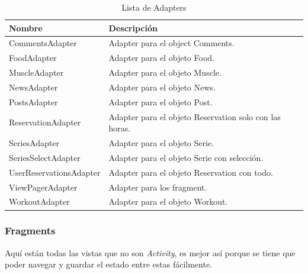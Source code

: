 \documentclass[12pt,a4paper]{article}
\begin{document}
\begin{table}[h!]
\centering
\begin{tabular}{  |l|l| }
\hline
Nombre & Descripción \\
\hline
 CommentsAdapter & Adapter para el object Comments. \\ 
 \hline
 FoodAdapter & Adapter para el objeto Food. \\  
 \hline
 MuscleAdapter & Adapter para el objeto Muscle. \\
 \hline
  NewsAdapter & Adapter para el objeto News. \\
 \hline
  PostsAdapter & Adapter para el objeto Post. \\
 \hline
  ReservationAdapter & Adapter para el objeto Reservation solo con las horas. \\
 \hline
 SeriesAdapter & Adapter para el objeto Serie. \\
 \hline
 SeriesSelectAdapter & Adapter para el objeto Serie con selección. \\
 \hline
 UserReservationsAdapter & Adapter para el objeto Reservation con todo. \\
 \hline
 ViewPagerAdapter & Adapter para los fragment. \\
 \hline
 WorkoutAdapter & Adapter para el objeto Workout. \\
 \hline
\end{tabular}
\caption{Lista de Adapters}
\end{table}

\subsubsection{Fragments}
Aquí están todas las vistas que no son \textit{Activity}, es mejor así porque se tiene que poder navegar y guardar el estado entre estas fácilmente.
\end{document}
